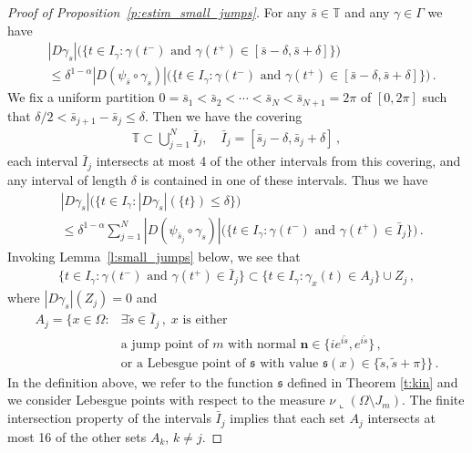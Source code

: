 \documentclass[fleqn
]{article}
\numberwithin{equation}{section}
\newcommand{\T}{{\mathbb T}}
\theoremstyle{definition}
\begin{document}
\begin{proof}[Proof of Proposition~\ref{p:estim_small_jumps}]
For any $\bar s\in \T$ and any $\gamma\in\Gamma$  we have
\begin{align*}
&
|D\gamma_s|
\big(
\lbrace
t\in I_\gamma\colon 
\gamma(t^-)\text{ and }\gamma(t^+)\in [\bar s-\delta,\bar s +\delta]
\rbrace
\big)
\\
&
\leq \delta^{1-\alpha} |D(\psi_{\bar s}\circ\gamma_s)|
\big(
\lbrace
t\in I_\gamma\colon 
\gamma(t^-)\text{ and }\gamma(t^+)\in [\bar s-\delta,\bar s +\delta]
\rbrace
\big)\,.
\end{align*}
We fix a uniform partition $0=\bar s_1 <\bar s_2 < \cdots <\bar s_N <\bar s_{N+1}=2\pi$ of $[0,2\pi]$ such that
$\delta/2 <  \bar s_{j+1}-\bar s_j \leq \delta$. 
Then we have the covering
\begin{align*}
\T\subset\bigcup_{j=1}^N \bar I_j,\quad \bar I_j = [\bar s_j-\delta,\bar s_j +\delta]\,,
\end{align*}
 each interval $\bar I_j$ intersects at most 4 of the other intervals from this covering,
 and any interval of length $\delta$ is contained in one of these intervals.
Thus we have
\begin{align*}
&
|D\gamma_s|
\big(
\lbrace 
t\in I_\gamma\colon 
|D\gamma_s|(\lbrace t\rbrace )\leq \delta\rbrace\big)
\\
&
\leq
\delta^{1-\alpha} 
\sum_{j=1}^N 
|D(\psi_{\bar s_j}\circ\gamma_s)|
\big(
\lbrace
t\in I_\gamma\colon 
\gamma(t^-)\text{ and }\gamma(t^+)\in \bar I_j
\rbrace
\big)\,.
\end{align*}
Invoking Lemma~\ref{l:small_jumps} below, we see that
\begin{align*}
\lbrace
t\in I_\gamma\colon 
\gamma(t^-)\text{ and }\gamma(t^+)\in \bar I_j
\rbrace
\subset
\lbrace 
t\in I_\gamma\colon \gamma_x(t)\in A_j
\rbrace \cup Z_j\,,
\end{align*}
where $|D\gamma_s|(Z_j)=0$ and
\begin{align*}
A_j
=\Big\lbrace x\in\Omega\colon 
&
\exists\tilde s\in \bar I_j\,,
\;
x\text{ is either }
\\
&
\text{a jump point of }m
\text{ with  normal }\mathbf n\in \lbrace ie^{i\tilde s},e^{i\tilde s}\rbrace \,,
\\
&
\text{or a Lebesgue point of } \mathfrak{s}
\text{ with value }
\mathfrak s (x)\in \lbrace \tilde s, \tilde s + \pi\rbrace
\Big\rbrace\,.
\end{align*}
In the definition above, we refer to the function $\mathfrak s$ defined in Theorem \ref{t:kin} and we consider Lebesgue points with respect to the measure $\nu \llcorner (\Omega \setminus J_m)$.
The finite intersection property of the intervals $\bar I_j$ implies that each set $A_j$ intersects at most 16 of the other sets $A_k$, $k\neq j$.

\end{proof}
\end{document}
